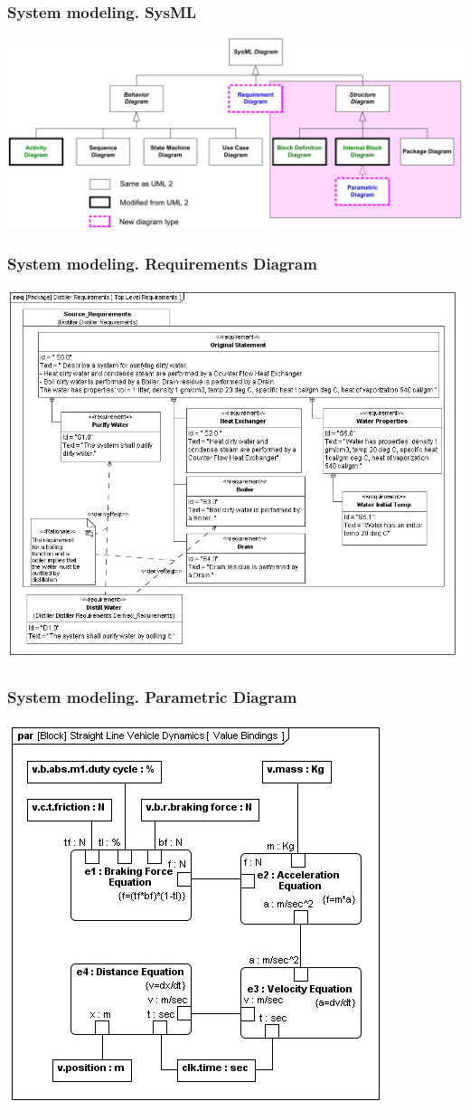 \documentclass[10pt,dvipsnames]{beamer}
\begin{document}
\begin{frame}
  \frametitle{System modeling. SysML }
  \centering
    \includegraphics[width=1\linewidth]{qms-pics/diagrams.pdf}
\end{frame}
\begin{frame}
  \frametitle{System modeling. Requirements Diagram}
  \centering
    \includegraphics[width=0.9\linewidth]{qms-pics/req-ex.png}
\end{frame}
\begin{frame}
  \frametitle{System modeling. Parametric Diagram}
  \centering
    \includegraphics[width=0.7\linewidth]{qms-pics/par-ex.png}
\end{frame}
\end{document}
